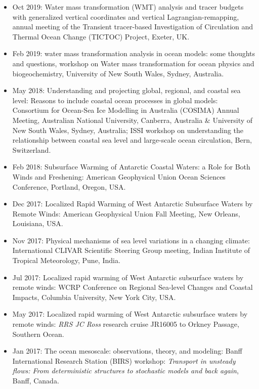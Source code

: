 \begin{itemize}[leftmargin=*]
\item Oct 2019: {\sc Water mass transformation (WMT) analysis
  and tracer budgets with generalized vertical coordinates and vertical Lagrangian-remapping}, annual meeting of the Transient tracer-based Investigation of Circulation and Thermal Ocean Change (TICTOC) Project, Exeter, UK.

\item Feb 2019: {\sc water mass transformation analysis in ocean models: some thoughts and questions}, workshop on Water mass transformation for ocean physics and biogeochemistry, University of New South Wales, Sydney, Australia.  

\item May 2018: {\sc Understanding and projecting global, regional, and coastal sea level: Reasons to include coastal ocean processes in global models}: Consortium for Ocean-Sea Ice Modelling in Australia (COSIMA) Annual Meeting, Australian National University, Canberra, Australia \& University of New South Wales, Sydney, Australia; ISSI workshop on understanding the relationship between coastal sea level and large-scale ocean circulation, Bern, Switzerland. 

\item Feb 2018: {\sc Subsurface Warming of Antarctic Coastal Waters: a Role for Both Winds and Freshening}: {\sc American Geophysical Union Ocean Sciences Conference}, Portland, Oregon, USA.

\item Dec 2017: {\sc Localized Rapid Warming of West Antarctic Subsurface Waters by Remote Winds}: American Geophysical Union Fall Meeting, New Orleans, Louisiana, USA. 

\item Nov 2017: {\sc Physical mechanisms of sea level variations in a changing climate}: International CLIVAR Scientific Steering Group meeting, Indian Institute of Tropical Meteorology, Pune, India.


\item Jul 2017: {\sc Localized rapid warming of West Antarctic
    subsurface waters by remote winds}: WCRP Conference on Regional
  Sea-level Changes and Coastal Impacts, Columbia University, New York City, USA. 

\item May 2017: {\sc Localized rapid warming of West Antarctic
    subsurface waters by remote winds}: {\it RRS JC Ross} research cruise
  JR16005 to Orkney Passage, Southern Ocean.

\item Jan 2017: {\sc The ocean mesoscale: observations, theory, and
    modeling}: Banff International Research Station (BIRS) workshop:
  {\it Transport in unsteady flows: From deterministic structures to
    stochastic models and back again}, Banff, Canada.


\end{itemize}
